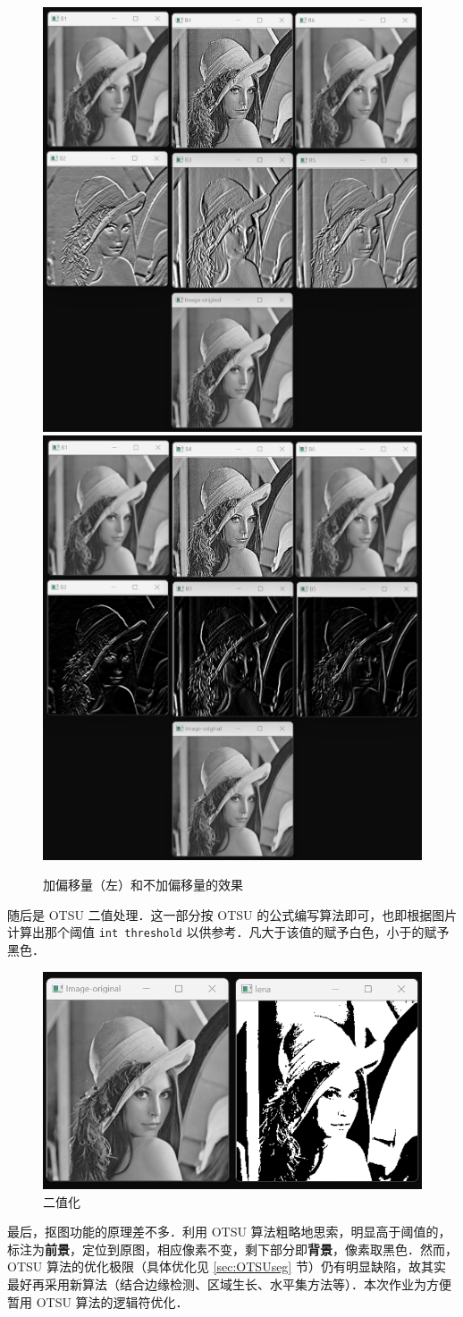 \documentclass[12pt,a4paper,twoside]{ctexart}
\numberwithin{figure}{section}
\numberwithin{equation}{section}
\begin{document}
\begin{figure}[ht]
    \centering
    \includegraphics[width=.35\textwidth]{shift.jpg}
    \quad
    \includegraphics[width=.35\textwidth]{no_shift.jpg}
    \caption{加偏移量（左）和不加偏移量的效果}
\end{figure}

随后是 OTSU 二值处理．这一部分按 OTSU 的公式编写算法即可，也即根据图片计算出那个阈值 \verb|int threshold| 以供参考．凡大于该值的赋予白色，小于的赋予黑色．

\begin{figure}[ht]
    \centering
    \includegraphics[width=.5\textwidth]{otsu.jpg}
    \caption{二值化}
\end{figure}

最后，抠图功能的原理差不多．利用 OTSU 算法粗略地思索，明显高于阈值的，标注为\textbf{前景}，定位到原图，相应像素不变，剩下部分即\textbf{背景}，像素取黑色．然而，OTSU 算法的优化极限（具体优化见 \ref{sec:OTSUseg} 节）仍有明显缺陷，故其实最好再采用新算法（结合边缘检测、区域生长、水平集方法等）．本次作业为方便暂用 OTSU 算法的逻辑符优化．
\end{document}
